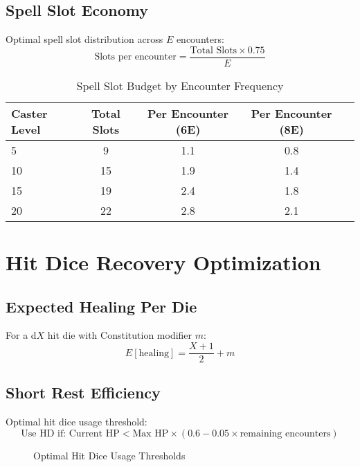 \documentclass[11pt,letterpaper,openany]{book}
\begin{document}
\subsection{Spell Slot Economy}

Optimal spell slot distribution across $E$ encounters:
\begin{equation}
\text{Slots per encounter} = \frac{\text{Total Slots} \times 0.75}{E}
\end{equation}

\begin{table}[h]
\centering
\begin{tabular}{@{}lcccc@{}}
\toprule
\textbf{Caster Level} & \textbf{Total Slots} & \textbf{Per Encounter (6E)} & \textbf{Per Encounter (8E)} \\
\midrule
5 & 9 & 1.1 & 0.8 \\
10 & 15 & 1.9 & 1.4 \\
15 & 19 & 2.4 & 1.8 \\
20 & 22 & 2.8 & 2.1 \\
\bottomrule
\end{tabular}
\caption{Spell Slot Budget by Encounter Frequency}
\end{table}

\section{Hit Dice Recovery Optimization}

\subsection{Expected Healing Per Die}

For a d$X$ hit die with Constitution modifier $m$:
\begin{equation}
E[\text{healing}] = \frac{X+1}{2} + m
\end{equation}

\subsection{Short Rest Efficiency}

Optimal hit dice usage threshold:
\begin{equation}
\text{Use HD if: } \text{Current HP} < \text{Max HP} \times \left(0.6 - 0.05 \times \text{remaining encounters}\right)
\end{equation}

\begin{figure}[h]
\centering
{}
\caption{Optimal Hit Dice Usage Thresholds}
\end{figure}
\end{document}
